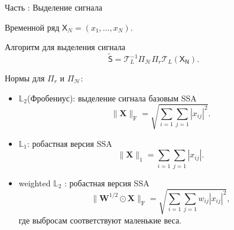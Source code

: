 \documentclass[10pt, ucs, notheorems, handout]{beamer}
\DeclareMathOperator{\med}{med}
\DeclareMathOperator*{\argmin}{argmin}
\newcommand{\tX}[1]{\mathsf{#1}}
\newcommand{\RomanNumeralCaps}[1]
{\MakeUppercase{\romannumeral #1}}
\begin{document}
\begin{frame}{Часть \RomanNumeralCaps{1}: Выделение сигнала}
	
	Временной ряд $\tX{X}_N=(x_1, \ldots, x_{N})$.
	\begin{block}{Алгоритм для выделения сигнала}
		\begin{equation*}
			\tilde{\tX{S}} = \mathcal{T}_L^{-1} \Pi_{\mathcal{H}} \Pi_{r} \mathcal{T}_L (\tX{X_N}).
		\end{equation*}
	\end{block}
	
	
	Нормы для $\Pi_r$ и $\Pi_{\mathcal{H}}$:
	\begin{itemize}
		\item $\mathbb{L}_2$(Фробениус): выделение сигнала базовым SSA
		$$\|\mathbf{X}\|_\mathrm{F} = \sqrt{\sum_{i = 1}\sum_{j = 1}|x_{ij}|^2}.$$
		\item $\mathbb{L}_1$: робастная версия SSA
		$$\|\mathbf{X}\|_1 = \sum_{i = 1}\sum_{j = 1}|x_{ij}|.$$
		\item weighted $\mathbb{L}_2$ : робастная версия SSA
		$$\|\mathbf{W}^{1/2}\odot\mathbf{X}\|_\mathrm{F} = \sqrt{\sum_{i = 1}\sum_{j = 1}w_{ij}|x_{ij}|^2},$$
где выбросам соответствуют маленькие веса.
	\end{itemize}
	\note{}
\end{frame}

\end{document}
